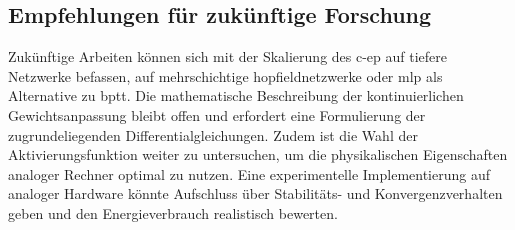 \subsection{Empfehlungen für zukünftige Forschung}

Zukünftige Arbeiten können sich mit der Skalierung des \gls{c-ep} auf tiefere Netzwerke befassen, \zb auf mehrschichtige \gls{hopfieldnetzwerk}e oder \gls{mlp} als Alternative zu \ac{bptt}. Die mathematische Beschreibung der kontinuierlichen Gewichtsanpassung bleibt offen und erfordert eine Formulierung der zugrundeliegenden Differentialgleichungen. Zudem ist die Wahl der Aktivierungsfunktion weiter zu untersuchen, um die physikalischen Eigenschaften analoger Rechner optimal zu nutzen. Eine experimentelle Implementierung auf analoger Hardware könnte Aufschluss über Stabilitäts- und Konvergenzverhalten geben und den Energieverbrauch realistisch bewerten.
